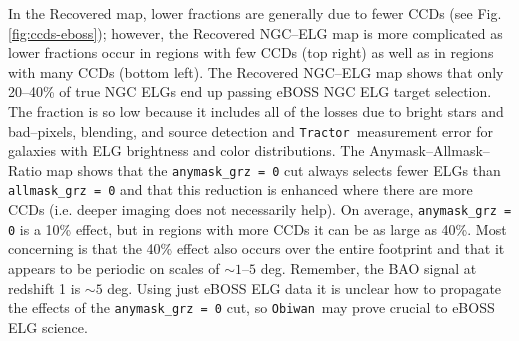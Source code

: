 \documentclass[a4paper,fleqn,usenatbib]{mnras}
\newcommand{\tractor}{{\tt Tractor}}
\newcommand{\legacypipe}{{\tt Legacypipe}}
\newcommand{\obiwan}{{\tt Obiwan}}
\begin{document}

In the Recovered map, lower fractions are generally due to fewer CCDs (see Fig. \ref{fig:ccds-eboss}); however, the Recovered NGC--ELG map is more complicated as lower fractions occur in regions with few CCDs (top right) as well as in regions with many CCDs (bottom left). The Recovered NGC--ELG map shows that only 20--40\% of true NGC ELGs end up passing eBOSS NGC ELG target selection. The fraction is so low because it includes all of the losses due to bright stars and bad--pixels, blending, and source detection and \tractor\, measurement error for galaxies with ELG brightness and color distributions. The Anymask--Allmask--Ratio map shows that the \verb|anymask_grz = 0| cut always selects fewer ELGs than \verb|allmask_grz = 0| and that this reduction is enhanced where there are more CCDs (i.e. deeper imaging does not necessarily help). On average, \verb|anymask_grz = 0| is a 10\% effect, but in regions with more CCDs it can be as large as 40\%. Most concerning is that the 40\% effect also occurs over the entire footprint and that it appears to be periodic on scales of $\sim 1$--$5$ deg. Remember, the BAO signal at redshift 1 is $\sim 5$ deg. Using just eBOSS ELG data it is unclear how to propagate the effects of the \verb|anymask_grz = 0| cut, so \obiwan\, may prove crucial to eBOSS ELG science.
\end{document}
